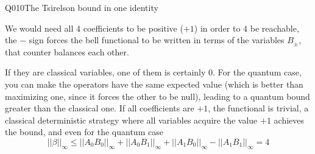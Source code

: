\begin{entry}{Q010}{The Tsirelson bound in one identity}
\begin{solution}
We would need all 4 coefficients to be positive ($+1$) in order to $4$ be reachable, the $-$ sign forces the bell functional to be written in terms of the variables $B_{\pm}$, that counter balances each other.


\end{solution}

\begin{takeaway}
If they are classical variables, one of them is certainly $0$. For the quantum case, you can make the operators have the same expected value (which is better than maximizing one, since it forces the other to be null), leading to a quantum bound greater than the classical one. If all coefficients are $+1$, the functional is trivial, a classical deterministic strategy where all variables acquire the value $+1$ achieves the bound, and even for the quantum case 
\begin{equation}
    ||\beta ||_{\infty} \leq ||A_0B_0||_{\infty}  + ||A_0B_1||_{\infty}  + ||A_1B_0||_{\infty}  - ||A_1B_1||_{\infty} = 4 
\end{equation}
\end{takeaway}


\end{entry}